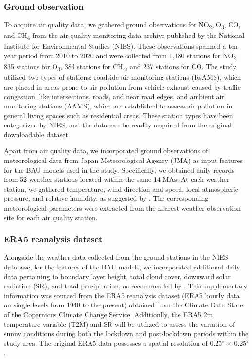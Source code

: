 \subsubsection*{Ground observation}
To acquire air quality data, we gathered ground observations for NO\textsubscript{2}, O\textsubscript{3}, CO, and CH\textsubscript{4} from the air quality monitoring data archive published by the National Institute for Environmental Studies (NIES). These observations spanned a ten-year period from 2010 to 2020 and were collected from 1,180 stations for NO\textsubscript{2}, 835 stations for O\textsubscript{3}, 383 stations for CH\textsubscript{4}, and 237 stations for CO. The study utilized two types of stations: roadside air monitoring stations (RsAMS), which are placed in areas prone to air pollution from vehicle exhaust caused by traffic congestion, like intersections, roads, and near road edges, and ambient air monitoring stations (AAMS), which are established to assess air pollution in general living spaces such as residential areas. These station types have been categorized by NIES, and the data can be readily acquired from the original downloadable dataset. \par
Apart from air quality data, we incorporated ground observations of meteorological data from Japan Meteorological Agency (JMA) as input features for the BAU models used in the study. Specifically, we obtained daily records from 52 weather stations located within the same 14 MAs. At each weather station, we gathered temperature, wind direction and speed, local atmospheric pressure, and relative humidity, as suggested by \citep{grange2021covid}. The corresponding meteorological parameters were extracted from the nearest weather observation site for each air quality station.\par

\subsubsection*{ERA5 reanalysis dataset}
Alongside the weather data collected from the ground stations in the NIES database, for the features of the BAU models, we incorporated additional daily data pertaining to boundary layer height, total cloud cover, downward solar radiation (SR), and total precipitation, as recommended by \citep{shi2021abrupt}. This supplementary information was sourced from the ERA5 reanalysis dataset (ERA5 hourly data on single levels from 1940 to the present) obtained from the Climate Data Store of the Copernicus Climate Change Service. Additionlly, the ERA5 2m temperature variable (T2M) and SR will be utilized to assess the variation of sunny conditions during both the lockdown and post-lockdown periods within the study area. The original ERA5 data possesses a spatial resolution of 0.25$^{\circ}$ $\times$ 0.25$^{\circ}$ .\par
